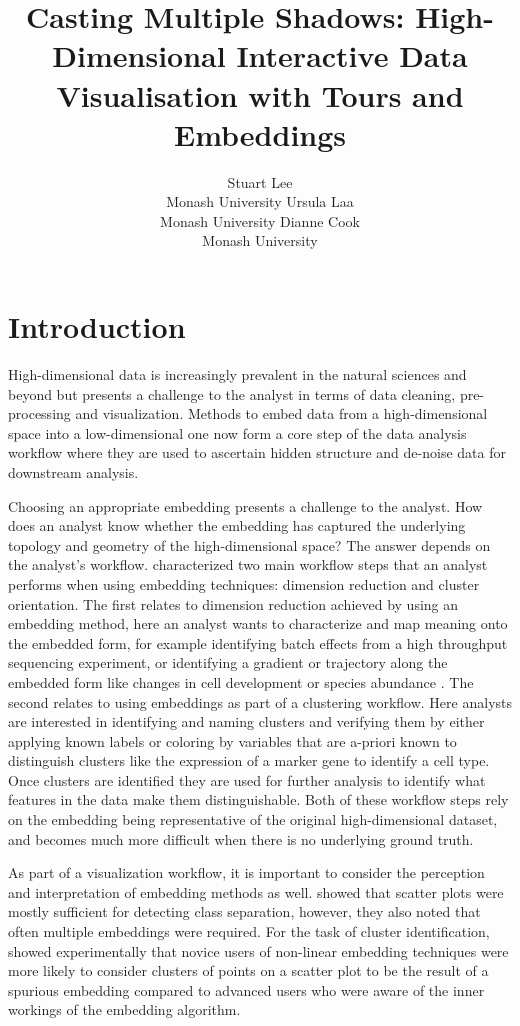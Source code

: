\documentclass[article,notitle]{jdssv}
\author{
Stuart Lee\\Monash University \And Ursula Laa\\Monash University \And Dianne Cook\\Monash University
}
\title{Casting Multiple Shadows: High-Dimensional Interactive Data Visualisation with Tours and Embeddings}
\begin{document}
\newpage

\hypertarget{introduction}{%
\section{Introduction}\label{introduction}}

High-dimensional data is increasingly prevalent in the natural sciences and
beyond but presents a challenge to the analyst in terms of data cleaning,
pre-processing and visualization. Methods to embed data from a high-dimensional
space into a low-dimensional one now form a core step of the data analysis
workflow where they are used to ascertain hidden structure and de-noise data
for downstream analysis.

Choosing an appropriate embedding presents a challenge to the analyst. How does
an analyst know whether the embedding has captured the underlying topology and
geometry of the high-dimensional space? The answer depends on the analyst's
workflow. \citet{Brehmer2014-hk} characterized two main workflow steps that an
analyst performs when using embedding techniques: dimension reduction and
cluster orientation. The first relates to dimension reduction achieved by using
an embedding method, here an analyst wants to characterize and map meaning onto
the embedded form, for example identifying batch effects from a high throughput
sequencing experiment, or identifying a gradient or trajectory along the
embedded form like changes in cell development or species abundance \citep{Nguyen2019-yh}. The second relates to using embeddings as part of
a clustering workflow. Here analysts are interested in identifying and naming
clusters and verifying them by either applying known labels or coloring by
variables that are a-priori known to distinguish clusters like the expression of a marker gene to identify a cell type. Once clusters are identified they are used for further analysis to identify what features in the data make them distinguishable. Both of these
workflow steps rely on the embedding being representative of the original high-dimensional dataset, and becomes much more difficult when there is no underlying ground truth.

As part of a visualization workflow, it is important to consider the perception
and interpretation of embedding methods as well. \citet{Sedlmair2013-pn} showed that
scatter plots were mostly sufficient for detecting class separation, however,
they also noted that often multiple embeddings were required. For the task of
cluster identification, \citet{Lewis2012-ai} showed experimentally that novice users
of non-linear embedding techniques were more likely to consider clusters of
points on a scatter plot to be the result of a spurious embedding compared
to advanced users who were aware of the inner workings of the embedding
algorithm.
\end{document}

